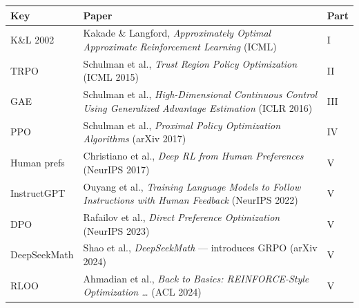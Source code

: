 \begin{center}
\small
\begin{tabularx}{\linewidth}{@{}l L l@{}}
\toprule
\textbf{Key} & \textbf{Paper} & \textbf{Part} \\
\midrule
K\&L 2002 & Kakade \& Langford, \emph{Approximately Optimal Approximate Reinforcement Learning} (ICML) & I \\
TRPO & Schulman et al., \emph{Trust Region Policy Optimization} (ICML 2015) & II \\
GAE & Schulman et al., \emph{High-Dimensional Continuous Control Using Generalized Advantage Estimation} (ICLR 2016) & III \\
PPO & Schulman et al., \emph{Proximal Policy Optimization Algorithms} (arXiv 2017) & IV \\
Human prefs & Christiano et al., \emph{Deep RL from Human Preferences} (NeurIPS 2017) & V \\
InstructGPT & Ouyang et al., \emph{Training Language Models to Follow Instructions with Human Feedback} (NeurIPS 2022) & V \\
DPO & Rafailov et al., \emph{Direct Preference Optimization} (NeurIPS 2023) & V \\
DeepSeekMath & Shao et al., \emph{DeepSeekMath} --- introduces GRPO (arXiv 2024) & V \\
RLOO & Ahmadian et al., \emph{Back to Basics: REINFORCE-Style Optimization \ldots} (ACL 2024) & V \\
\bottomrule
\end{tabularx}
\end{center}

